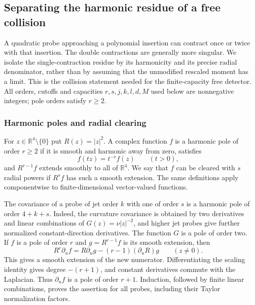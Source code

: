 \subsection{Separating the harmonic residue of a free collision}
\label{sec:free-collision-pole-separation}

A quadratic probe approaching a polynomial insertion can contract once or
twice with that insertion. The double contractions are generally more
singular. We isolate the single-contraction residue by its harmonicity
and its precise radial denominator, rather than by assuming that the
unmodified rescaled moment has a limit. This is the collision statement
needed for the finite-capacity free detector. All orders, cutoffs and capacities
$r,s,j,k,l,d,M$ used below are nonnegative integers; pole orders satisfy
$r\geq2$.

\subsubsection{Harmonic poles and radial clearing}
For $z\in\mathbb R^4\setminus\{0\}$ put $R(z)=|z|^2$.
A complex function $f$ is a harmonic pole of order $r\geq2$ if it is
smooth and harmonic away from zero, satisfies
\[
 f(tz)=t^{-r}f(z)\qquad(t>0),
\]
and $R^{r-1}f$ extends smoothly to all of $\mathbb R^4$.
We say that $f$ can be cleared with $s$ radial powers if $R^sf$ has
such a smooth extension. The same definitions apply componentwise to
finite-dimensional vector-valued functions.

The covariance of a probe of jet order $k$ with one of order $s$ is a
harmonic pole of order $4+k+s$. Indeed, the curvature covariance is
obtained by two derivatives and linear combinations of
$G(z)=\nu|z|^{-2}$, and higher jet probes give further normalized
constant-direction derivatives. The function $G$ is a pole of order
two. If $f$ is a pole of order $r$ and $g=R^{r-1}f$ is its smooth
extension, then
\begin{equation}\label{eq:collision-derivative-numerator}
 R^r\partial_u f
 =R\partial_u g-(r-1)(\partial_uR)g
                       \qquad(z\ne0).
\end{equation}
This gives a smooth extension of the new numerator. Differentiating
the scaling identity gives degree $-(r+1)$, and constant derivatives
commute with the Laplacian. Thus $\partial_u f$ is a pole of order
$r+1$. Induction, followed by finite linear combinations, proves the
assertion for all probes, including their Taylor normalization factors.

